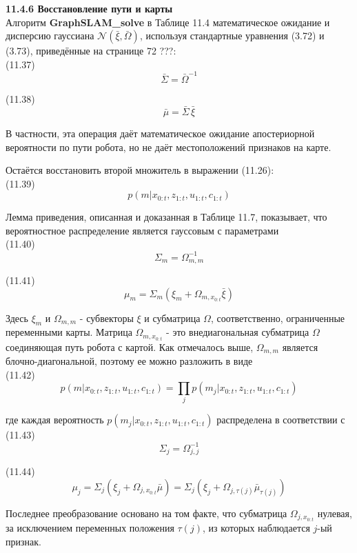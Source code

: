 \documentclass[10pt,a4paper]{article}
\begin{document}
\textbf{11.4.6	Восстановление пути и карты}\\

Алгоритм \textbf{GraphSLAM\_solve} в Таблице 11.4 математическое ожидание и дисперсию гауссиана $\mathcal{N}(\bar{\xi},\bar{\varOmega})$, используя стандартные уравнения (3.72) и (3.73), приведённые на странице 72 ???:\\

(11.37)
$$\bar{\varSigma}=\bar{\varOmega}^{-1}$$

(11.38)
$$\bar{\mu}=\bar{\varSigma}\,\bar{\xi}$$

В частности, эта операция даёт математическое ожидание апостериорной вероятности по пути робота, но не даёт местоположений признаков на карте.

Остаётся восстановить второй множитель в выражении (11.26):\\

(11.39)
$$p(m|x_{0:t},z_{1:t},u_{1:t},c_{1:t})$$

Лемма приведения, описанная и доказанная в Таблице 11.7, показывает, что вероятностное распределение является гауссовым с параметрами\\

(11.40)
$$\varSigma_m=\varOmega_{m,m}^{-1}$$

(11.41)
$$\mu_m=\varSigma_m(\xi_m+\varOmega_{m,x_{0:t}}\bar{\xi})$$

Здесь $\xi_m$ и $\varOmega_{m,m}$ - субвекторы $\xi$ и субматрица $\varOmega$, соответственно, ограниченные переменными карты.  Матрица $\varOmega_{m,x_{0:t}}$  - это внедиагональная субматрица $\varOmega$ соединяющая путь робота с картой. Как отмечалось выше, $\varOmega_{m,m}$ является блочно-диагональной, поэтому ее можно разложить в виде\\

(11.42)
$$p(m|x_{0:t},z_{1:t},u_{1:t},c_{1:t})=\prod_j p(m_j|x_{0:t},z_{1:t},u_{1:t},c_{1:t})$$

где каждая вероятность $p(m_j|x_{0:t},z_{1:t},u_{1:t},c_{1:t})$ распределена в соответствии с\\

(11.43)
$$\varSigma_j=\varOmega_{j,j}^{-1}$$

(11.44)
$$\mu_j=\varSigma_j(\xi_j+\varOmega_{j,x_{0:t}}\bar{\mu})=\varSigma_j(\xi_j+\varOmega_{j,\tau(j)}\bar{\mu}_{\tau(j)})$$

Последнее преобразование основано на том факте, что субматрица  $\varOmega_{j,x_{0:t}}$ нулевая, за исключением переменных положения $\tau(j)$, из которых наблюдается $j$-ый признак. 
\end{document}
